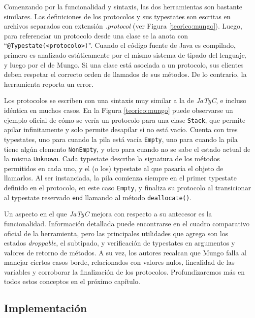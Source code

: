 Comenzando por la funcionalidad y sintaxis, las dos herramientas son bastante similares. Las definiciones de los protocolos y sus typestates son escritas en archivos separados con extensión \textit{.protocol} (ver Figura \ref{teorico:mungo}). Luego, para referenciar un protocolo desde una clase se la anota con ``\texttt{@Typestate(<protocolo>)}''. Cuando el código fuente de Java es compilado, primero es analizado estáticamente por el mismo sistema de tipado del lenguaje, y luego por el de Mungo. Si una clase está asociada a un protocolo, sus clientes deben respetar el correcto orden de llamados de sus métodos. De lo contrario, la herramienta reporta un error.



Los protocolos se escriben con una sintaxis muy similar a la de \textit{JaTyC}, e incluso idéntica en muchos casos. En la Figura \ref{teorico:mungo} puede observarse un ejemplo oficial de cómo se vería un protocolo para una clase \texttt{Stack}, que permite apilar infinitamente y solo permite desapilar si no está vacío. Cuenta con tres typestates, uno para cuando la pila está vacía \texttt{Empty}, uno para cuando la pila tiene algún elemento \texttt{NonEmpty}, y otro para cuando no se sabe el estado actual de la misma \texttt{Unknown}. Cada typestate describe la signatura de los métodos permitidos en cada uno, y el (o los) typestate al que pasaría el objeto de llamarlos. Al ser instanciada, la pila comienza siempre en el primer typestate definido en el protocolo, en este caso \texttt{Empty}, y finaliza su protocolo al transicionar al typestate reservado \texttt{end} llamando al método \texttt{deallocate()}.

Un aspecto en el que \textit{JaTyC} mejora con respecto a su antecesor es la funcionalidad. Información detallada puede encontrarse en el cuadro comparativo oficial de la herramienta\cite{jatyc:mungo-comparison}, pero las principales utilidades que agrega son los estados \textit{droppable}, el subtipado, y verificación de typestates en argumentos y valores de retorno de métodos. A su vez, los autores recalcan que Mungo falla al manejar ciertos casos borde, relacionados con valores nulos, linealidad de las variables y corroborar la finalización de los protocolos. Profundizaremos más en todos estos conceptos en el próximo capítulo. %

\subsection{Implementación}

